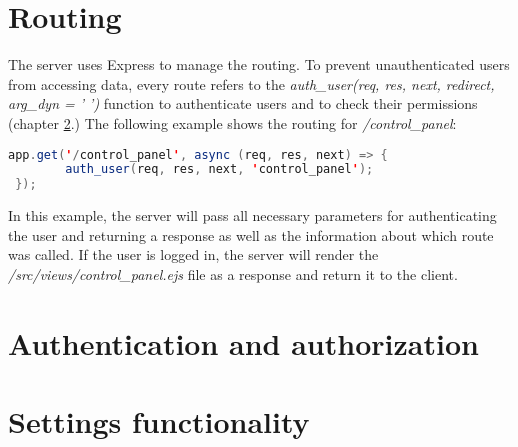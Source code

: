 
\section{Routing}
\label{sec:routing}

The server uses Express to manage the routing. To prevent unauthenticated users from accessing data, every route refers to the \textit{auth\_user(req, res, next, redirect, arg\_dyn = ' ')} function to authenticate users and to check their permissions (chapter \ref{sec:authentication_and_authorization}.) The following example shows the routing for \textit{/control\_panel}:

\begin{lstlisting}[language = Java, numbers = none]
 app.get('/control_panel', async (req, res, next) => {
 		auth_user(req, res, next, 'control_panel');
 });
\end{lstlisting}

In this example, the server will pass all necessary parameters for authenticating the user and returning a response as well as the information about which route was called. If the user is logged in, the server will render the \textit{/src/views/control\_panel.ejs} file as a response and return it to the client.





\section{Authentication and authorization}
\label{sec:authentication_and_authorization}





\section{Settings functionality}
\label{sec:settings_functionality}



